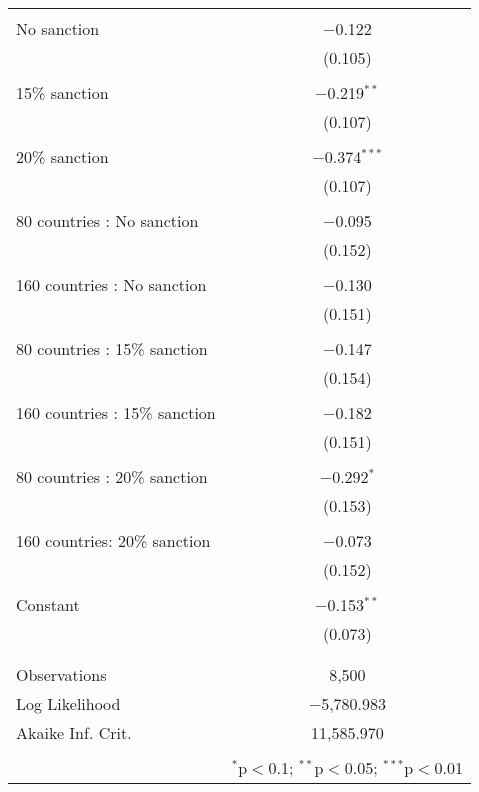 \documentclass[12pt,letterpaper]{article}
\begin{document}
\begin{enumerate}
\begin{enumerate}
\begin{table}[!htbp]
\begin{tabular}{@{\extracolsep{5pt}}lc}
		 		& \\  No sanction & $-$0.122 \\   & (0.105) \\   & \\  15\% sanction & $-$0.219$^{**}$ \\   & (0.107) \\   & \\  20\% sanction & $-$0.374$^{***}$ \\   & (0.107) \\   & \\  80 countries : No sanction & $-$0.095 \\   & (0.152) \\   & \\  160 countries : No sanction & $-$0.130 \\   & (0.151) \\   & \\  80 countries : 15\% sanction & $-$0.147 \\   & (0.154) \\   & \\  160 countries : 15\% sanction & $-$0.182 \\   & (0.151) \\   & \\  80 countries : 20\% sanction & $-$0.292$^{*}$ \\   & (0.153) \\   & \\  160 countries: 20\% sanction & $-$0.073 \\   & (0.152) \\   & \\  Constant & $-$0.153$^{**}$ \\   & (0.073) \\   & \\ \hline \\[-1.8ex] Observations & 8,500 \\ Log Likelihood & $-$5,780.983 \\ Akaike Inf. Crit. & 11,585.970 \\ 
		 		\hline 
		 		\hline \\
		 		[-1.8ex] \textit & \multicolumn{1}{r}{$^{*}$p$<$0.1; $^{**}$p$<$0.05; $^{***}$p$<$0.01} \\
		 	\end{tabular} 
		 \end{table} 
		 
		 \vspace{.15cm}
		 

\end{enumerate}
\end{enumerate}
\end{document}
